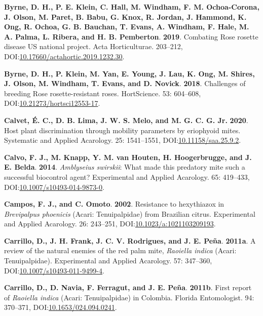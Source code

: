 \documentclass[12pt,final,CPage]{ufthesis}
\newlength{\cslhangindent}
\newenvironment{CSLReferences}[2] %
{%
	\setlength{\parindent}{0pt}
	\ifodd #1 \everypar{\setlength{\hangindent}{\cslhangindent}}\ignorespaces\fi
	\ifnum #2 > 0
	\setlength{\parskip}{#2\baselineskip}
	\fi
}%
{}
\begin{document}
{\begin{CSLReferences}{1}{0}
  \leavevmode{}%
  \textbf{Byrne, D. H., P. E. Klein, C. Hall, M. Windham, F. M. Ochoa-Corona, J. Olson, M. Paret, B. Babu, G. Knox, R. Jordan, J. Hammond, K. Ong, R. Ochoa, G. B. Bauchan, T. Evans, A. Windham, F. Hale, M. A. Palma, L. Ribera, and H. B. Pemberton}. \textbf{2019}. Combating {Rose rosette disease} {US} national project. Acta Horticulturae. 203--212, DOI:\href{https://doi.org/10.17660/actahortic.2019.1232.30}{10.17660/actahortic.2019.1232.30}.

  \leavevmode{}%
  \textbf{Byrne, D. H., P. Klein, M. Yan, E. Young, J. Lau, K. Ong, M. Shires, J. Olson, M. Windham, T. Evans, and D. Novick}. \textbf{2018}. Challenges of breeding {Rose rosette}-resistant roses. {HortScience}. 53: 604--608, DOI:\href{https://doi.org/10.21273/hortsci12553-17}{10.21273/hortsci12553-17}.

  \leavevmode{}%
  \textbf{Calvet, É. C., D. B. Lima, J. W. S. Melo, and M. G. C. G. Jr.} \textbf{2020}. Host plant discrimination through mobility parameters by eriophyoid mites. Systematic and Applied Acarology. 25: 1541--1551, DOI:\href{https://doi.org/10.11158/saa.25.9.2}{10.11158/saa.25.9.2}.

  \leavevmode{}%
  \textbf{Calvo, F. J., M. Knapp, Y. M. van Houten, H. Hoogerbrugge, and J. E. Belda}. \textbf{2014}. {\emph{Amblyseius swirskii}}: What made this predatory mite such a successful biocontrol agent? Experimental and Applied Acarology. 65: 419--433, DOI:\href{https://doi.org/10.1007/s10493-014-9873-0}{10.1007/s10493-014-9873-0}.

  \leavevmode{}%
  \textbf{Campos, F. J., and C. Omoto}. \textbf{2002}. Resistance to hexythiazox in {\emph{Brevipalpus phoenicis}} ({Acari}: {Tenuipalpidae}) from {Brazilian} citrus. Experimental and Applied Acarology. 26: 243--251, DOI:\href{https://doi.org/10.1023/a:1021103209193}{10.1023/a:1021103209193}.

  \leavevmode{}%
  \textbf{Carrillo, D., J. H. Frank, J. C. V. Rodrigues, and J. E. Peña}. \textbf{2011a}. A review of the natural enemies of the red palm mite, {\emph{Raoiella indica}} ({Acari}: {Tenuipalpidae}). Experimental and Applied Acarology. 57: 347--360, DOI:\href{https://doi.org/10.1007/s10493-011-9499-4}{10.1007/s10493-011-9499-4}.

  \leavevmode{}%
  \textbf{Carrillo, D., D. Navia, F. Ferragut, and J. E. Peña}. \textbf{2011b}. First report of {\emph{Raoiella indica}} ({Acari}: {Tenuipalpidae}) in {Colombia}. Florida Entomologist. 94: 370--371, DOI:\href{https://doi.org/10.1653/024.094.0241}{10.1653/024.094.0241}.


\end{CSLReferences}}
\end{document}
